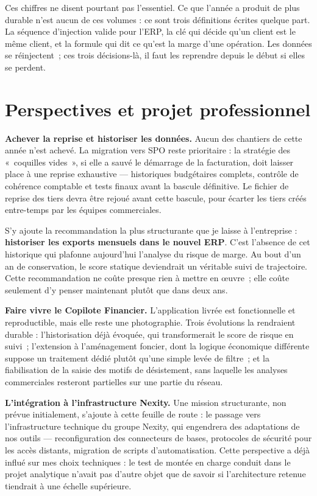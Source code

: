 Ces chiffres ne disent pourtant pas l'essentiel. Ce que l'année a produit de plus durable
n'est aucun de ces volumes : ce sont trois définitions écrites quelque part. La séquence
d'injection valide pour l'ERP, la clé qui décide qu'un client est le même client, et la
formule qui dit ce qu'est la marge d'une opération. Les données se réinjectent~; ces trois
décisions-là, il faut les reprendre depuis le début si elles se perdent.

\hypertarget{perspectives-et-projet-professionnel}{%
\section{Perspectives et projet professionnel}\label{perspectives-et-projet-professionnel}}

\textbf{Achever la reprise et historiser les données.} Aucun des chantiers de cette année n'est
achevé. La migration vers SPO reste prioritaire : la stratégie des «~coquilles vides~», si elle
a sauvé le démarrage de la facturation, doit laisser place à une reprise exhaustive ---
historiques budgétaires complets, contrôle de cohérence comptable et tests finaux avant la
bascule définitive. Le fichier de reprise des tiers devra être rejoué avant cette bascule,
pour écarter les tiers créés entre-temps par les équipes commerciales.

S'y ajoute la recommandation la plus structurante que je laisse à l'entreprise : \textbf{historiser
les exports mensuels dans le nouvel ERP}. C'est l'absence de cet historique qui plafonne
aujourd'hui l'analyse du risque de marge. Au bout d'un an de conservation, le score statique
deviendrait un véritable suivi de trajectoire. Cette recommandation ne coûte presque rien à
mettre en œuvre~; elle coûte seulement d'y penser maintenant plutôt que dans deux ans.

\textbf{Faire vivre le Copilote Financier.} L'application livrée est fonctionnelle et
reproductible, mais elle reste une photographie. Trois évolutions la rendraient durable :
l'historisation déjà évoquée, qui transformerait le score de risque en suivi~;
l'extension à l'aménagement foncier, dont la logique économique différente suppose un
traitement dédié plutôt qu'une simple levée de filtre~; et la fiabilisation de la saisie des
motifs de désistement, sans laquelle les analyses commerciales resteront partielles sur une
partie du réseau.

\textbf{L'intégration à l'infrastructure Nexity.} Une mission structurante, non prévue
initialement, s'ajoute à cette feuille de route : le passage vers l'infrastructure technique
du groupe Nexity, qui engendrera des adaptations de nos outils --- reconfiguration des
connecteurs de bases, protocoles de sécurité pour les accès distants, migration de scripts
d'automatisation. Cette perspective a déjà influé sur mes choix techniques : le test de montée
en charge conduit dans le projet analytique n'avait pas d'autre objet que de savoir si
l'architecture retenue tiendrait à une échelle supérieure.

